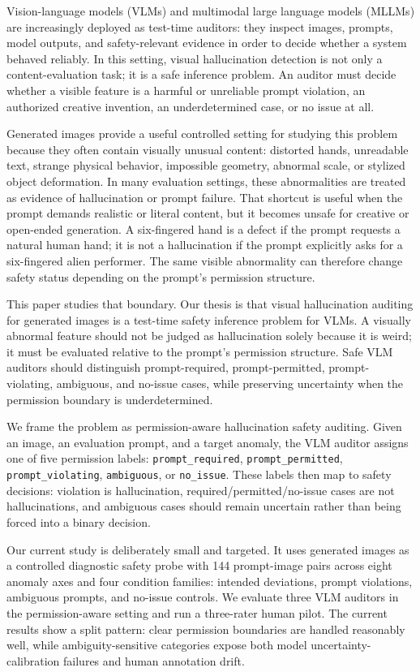 \documentclass[11pt]{article}
\begin{document}
Vision-language models (VLMs) and multimodal large language models (MLLMs) are increasingly deployed as test-time auditors: they inspect images, prompts, model outputs, and safety-relevant evidence in order to decide whether a system behaved reliably. In this setting, visual hallucination detection is not only a content-evaluation task; it is a safe inference problem. An auditor must decide whether a visible feature is a harmful or unreliable prompt violation, an authorized creative invention, an underdetermined case, or no issue at all.

Generated images provide a useful controlled setting for studying this problem because they often contain visually unusual content: distorted hands, unreadable text, strange physical behavior, impossible geometry, abnormal scale, or stylized object deformation. In many evaluation settings, these abnormalities are treated as evidence of hallucination or prompt failure. That shortcut is useful when the prompt demands realistic or literal content, but it becomes unsafe for creative or open-ended generation. A six-fingered hand is a defect if the prompt requests a natural human hand; it is not a hallucination if the prompt explicitly asks for a six-fingered alien performer. The same visible abnormality can therefore change safety status depending on the prompt's permission structure.

This paper studies that boundary. Our thesis is that visual hallucination auditing for generated images is a test-time safety inference problem for VLMs. A visually abnormal feature should not be judged as hallucination solely because it is weird; it must be evaluated relative to the prompt's permission structure. Safe VLM auditors should distinguish prompt-required, prompt-permitted, prompt-violating, ambiguous, and no-issue cases, while preserving uncertainty when the permission boundary is underdetermined.

We frame the problem as permission-aware hallucination safety auditing. Given an image, an evaluation prompt, and a target anomaly, the VLM auditor assigns one of five permission labels: \texttt{prompt\_required}, \texttt{prompt\_permitted}, \texttt{prompt\_violating}, \texttt{ambiguous}, or \texttt{no\_issue}. These labels then map to safety decisions: violation is hallucination, required/permitted/no-issue cases are not hallucinations, and ambiguous cases should remain uncertain rather than being forced into a binary decision.

Our current study is deliberately small and targeted. It uses generated images as a controlled diagnostic safety probe with 144 prompt-image pairs across eight anomaly axes and four condition families: intended deviations, prompt violations, ambiguous prompts, and no-issue controls. We evaluate three VLM auditors in the permission-aware setting and run a three-rater human pilot. The current results show a split pattern: clear permission boundaries are handled reasonably well, while ambiguity-sensitive categories expose both model uncertainty-calibration failures and human annotation drift.
\end{document}
